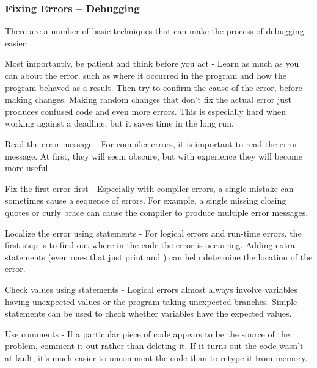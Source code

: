 \subsubsection{Fixing Errors -- Debugging}

There are a number of basic techniques that can make the process of debugging easier:  
\begin{tight_itemize}

\item Most importantly, be patient and think before you act - Learn as much as you can about the error, such as where it occurred in the program and how the program behaved as a result.  Then try to confirm the cause of the error, before making changes. Making random changes that don't fix the actual error just produces confused code and even more errors.  This is especially hard when working against a deadline, but it saves time in the long run.

\item Read the error message - For compiler errors, it is important to read the error message.  At first, they will seem obscure, but with experience they will become more useful.

\item Fix the first error first - Especially with compiler errors, a single mistake can sometimes cause a sequence of errors.  For example, a single missing closing quotes or curly brace can cause the compiler to produce multiple error messages. 

\item Localize the error using  statements - For logical errors and run-time errors, the first step is to find out where in the code the error is occurring.  Adding extra  statements (even ones that just print  and ) can help determine the location of the error.

\item Check values using  statements - Logical errors almost always involve variables having unexpected values or the program taking unexpected branches.  Simple  statements can be used to check whether variables have the expected values.

\item Use comments - If a particular piece of code appears to be the source of the problem, comment it out rather than deleting it.  If it turns out the code wasn't at fault, it's much easier to uncomment the code than to retype it from memory.  


\end{tight_itemize}
